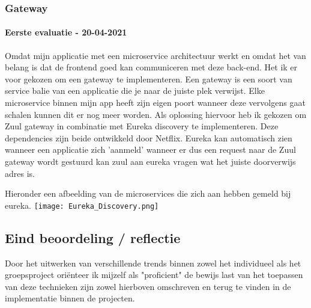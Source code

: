 \subsubsection{Gateway}\label{subsec:gateway}
\paragraph{Eerste evaluatie - 20-04-2021}
Omdat mijn applicatie met een microservice architectuur werkt en omdat het van belang is dat de frontend goed kan communiceren met deze back-end.
Het ik er voor gekozen om een gateway te implementeren.
Een gateway is een soort van service balie van een applicatie die je naar de juiste plek verwijst.
Elke microservice binnen mijn app heeft zijn eigen poort wanneer deze vervolgens gaat schalen kunnen dit er nog meer worden.
Als oplossing hiervoor heb ik gekozen om Zuul gateway in combinatie met Eureka discovery te implementeren.
Deze dependencies zijn beide ontwikkeld door Netflix.
Eureka kan automatisch zien wanneer een applicatie zich 'aanmeld' wanneer er dus een request naar de Zuul gateway
wordt gestuurd kan zuul aan eureka vragen wat het juiste doorverwijs adres is.

Hieronder een afbeelding van de microservices die zich aan hebben gemeld bij eureka.
\texttt{[image: Eureka\_Discovery.png]}\label{fig:eureka_discovery}


\subsection{Eind beoordeling / reflectie}
Door het uitwerken van verschillende trends binnen zowel het individueel als het groepsproject oriënteer ik mijzelf
als "proficient" de bewijs last van het toepassen van deze technieken zijn zowel hierboven omschreven en terug te
vinden in de implementatie binnen de projecten. 

\newpage
